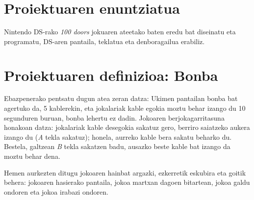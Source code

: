 \documentclass[dvipsnames]{AritzhClass}
\author{Elena Hernández eta Aritz Lopez}
\begin{document}
\izenburuorrialdea

\tableofcontents

\pagebreak

\section{Proiektuaren enuntziatua}

Nintendo DS-rako \textit{100 doors} jokuaren ateetako baten eredu bat diseinatu eta programatu, DS-aren pantaila, teklatua eta denboragailua erabiliz.

\section{Proiektuaren definizioa: Bonba}

Ebazpenerako pentsatu dugun atea zeran datza: Ukimen pantailan bonba bat agertuko da, 5 kablerekin, eta jokalariak kable egokia moztu behar izango du 10 segunduren buruan, bonba lehertu ez dadin. Jokoaren berjokagarritasuna honakoan datza: jokalariak kable desegokia sakatuz gero, berriro saiatzeko aukera izango du (\textit{A} tekla sakatuz); honela, aurreko kable bera sakatu beharko du. Bestela, galtzean \textit{B} tekla sakatzen badu, ausazko beste kable bat izango da moztu behar dena.

Hemen aurkezten ditugu jokoaren hainbat argazki, ezkerretik eskubira eta goitik behera: jokoaren hasierako pantaila, jokoa martxan dagoen bitartean, jokoa galdu ondoren eta jokoa irabazi ondoren.
\end{document}
